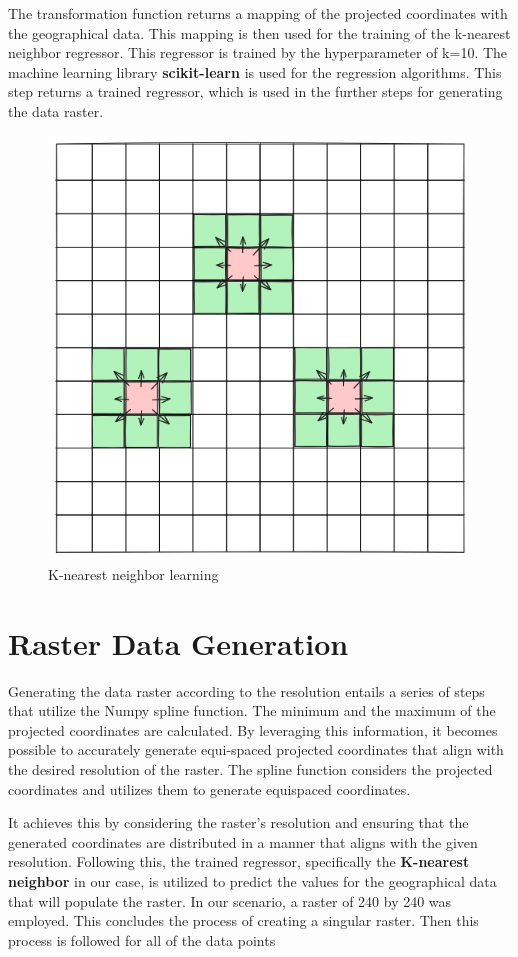 The transformation function returns a mapping of the projected coordinates with the geographical data.
This mapping is then used for the training of the k-nearest neighbor regressor. This regressor is trained by the hyperparameter of k=10. The machine learning library \textbf{scikit-learn} \cite{scikit-learn} is used for the regression algorithms.
This step returns a trained regressor, which is used in the further steps for generating the data raster.
\begin{figure}[H]
    \centering
    \includegraphics[width=0.5\linewidth]{figures/chapter-7/raster_interpolation.png}
    \caption{K-nearest neighbor learning}
    \label{fig:knn-learning}
\end{figure}

\section{Raster Data Generation}

Generating the data raster according to the resolution entails a series of steps that utilize the Numpy spline function. The minimum and the maximum of the projected coordinates are calculated. By leveraging this information, it becomes possible to accurately generate equi-spaced projected coordinates that align with the desired resolution of the raster.
The spline function considers the projected coordinates and utilizes them to generate equispaced coordinates.

It achieves this by considering the raster's resolution and ensuring that the generated coordinates are distributed in a manner that aligns with the given resolution.
Following this, the trained regressor, specifically the \textbf{K-nearest neighbor} in our case, is utilized to predict the values for the geographical data that will populate the raster.
In our scenario, a raster of 240 by 240 was employed. This concludes the process of creating a singular raster. Then this process is followed for all of the data points

